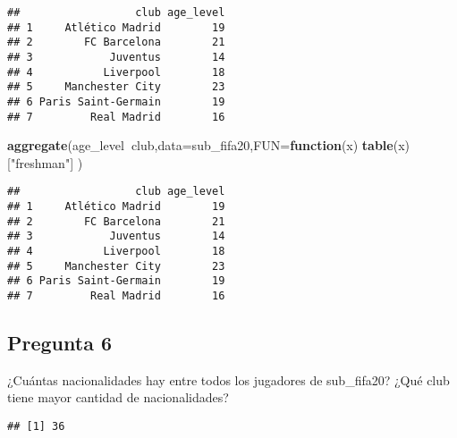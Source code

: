 \documentclass[
]{article}
\newenvironment{Shaded}{\begin{snugshade}}{\end{snugshade}}
\newcommand{\ControlFlowTok}[1]{\textcolor[rgb]{0.13,0.29,0.53}{\textbf{#1}}}
\newcommand{\DataTypeTok}[1]{\textcolor[rgb]{0.13,0.29,0.53}{#1}}
\newcommand{\KeywordTok}[1]{\textcolor[rgb]{0.13,0.29,0.53}{\textbf{#1}}}
\newcommand{\NormalTok}[1]{#1}
\newcommand{\OperatorTok}[1]{\textcolor[rgb]{0.81,0.36,0.00}{\textbf{#1}}}
\newcommand{\StringTok}[1]{\textcolor[rgb]{0.31,0.60,0.02}{#1}}
\begin{document}
\begin{verbatim}
##                  club age_level
## 1     Atlético Madrid        19
## 2        FC Barcelona        21
## 3            Juventus        14
## 4           Liverpool        18
## 5     Manchester City        23
## 6 Paris Saint-Germain        19
## 7         Real Madrid        16
\end{verbatim}

\begin{Shaded}
\begin{Highlighting}[]
\KeywordTok{aggregate}\NormalTok{(age_level}\OperatorTok{~}\NormalTok{club,}\DataTypeTok{data=}\NormalTok{sub_fifa20,}\DataTypeTok{FUN=}\ControlFlowTok{function}\NormalTok{(x) }\KeywordTok{table}\NormalTok{(x)[}\StringTok{"freshman"}\NormalTok{] )}
\end{Highlighting}
\end{Shaded}

\begin{verbatim}
##                  club age_level
## 1     Atlético Madrid        19
## 2        FC Barcelona        21
## 3            Juventus        14
## 4           Liverpool        18
## 5     Manchester City        23
## 6 Paris Saint-Germain        19
## 7         Real Madrid        16
\end{verbatim}

\hypertarget{pregunta-6}{%
\subsection{Pregunta 6}\label{pregunta-6}}

¿Cuántas nacionalidades hay entre todos los jugadores de sub\_fifa20?
¿Qué club tiene mayor cantidad de nacionalidades?

\begin{Shaded}
\end{Shaded}

\begin{verbatim}
## [1] 36
\end{verbatim}

\begin{Shaded}
\end{Shaded}
\end{document}
